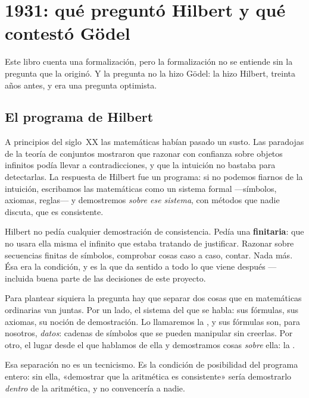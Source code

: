 \chapter{1931: qué preguntó Hilbert y qué contestó Gödel}
\label{cap:hilbert}

Este libro cuenta una formalización, pero la formalización no se entiende sin la pregunta que la
originó. Y la pregunta no la hizo Gödel: la hizo Hilbert, treinta años antes, y era una pregunta
optimista.

\section{El programa de Hilbert}

A principios del siglo~XX las matemáticas habían pasado un susto. Las paradojas de la teoría de
conjuntos mostraron que razonar con confianza sobre objetos infinitos podía llevar a
contradicciones, y que la intuición no bastaba para detectarlas. La respuesta de Hilbert fue un
programa: si no podemos fiarnos de la intuición, escribamos las matemáticas como un sistema formal
—símbolos, axiomas, reglas— y demostremos \emph{sobre ese sistema}, con métodos que nadie discuta,
que es consistente.

\begin{leccion}
Hilbert no pedía cualquier demostración de consistencia. Pedía una \textbf{finitaria}: que no usara
ella misma el infinito que estaba tratando de justificar. Razonar sobre secuencias finitas de
símbolos, comprobar cosas caso a caso, contar. Nada más. Ésa era la condición, y es la que da
sentido a todo lo que viene después — incluida buena parte de las decisiones de este proyecto.
\end{leccion}

Para plantear siquiera la pregunta hay que separar dos cosas que en matemáticas ordinarias van
juntas. Por un lado, el sistema del que se habla: sus fórmulas, sus axiomas, su noción de
demostración. Lo llamaremos la , y sus fórmulas son, para nosotros,
\emph{datos}: cadenas de símbolos que se pueden manipular sin creerlas. Por otro, el lugar desde el
que hablamos de ella y demostramos cosas \emph{sobre} ella: la .

Esa separación no es un tecnicismo. Es la condición de posibilidad del programa entero: sin ella,
«demostrar que la aritmética es consistente» sería demostrarlo \emph{dentro} de la aritmética, y no
convencería a nadie.

